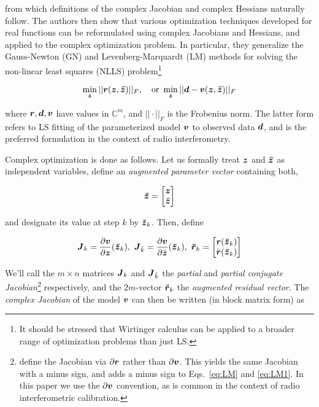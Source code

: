 \documentclass[useAMS,usenatbib]{mn2e}
\newcommand{\COMPLEX}{\mathbb{C}}
\newcommand{\zz}{\bmath{z}}
\newcommand{\zzc}{\bmath{\bar z}}
\newcommand{\rr}{\bmath{r}}
\newcommand{\vv}{\bmath{v}}
\newcommand{\mat}[1]{{\bmath{#1}}}
\newcommand{\JJ}{\mat{J}} %
\begin{document}
from which definitions of the complex Jacobian and complex Hessians naturally follow. The authors then show 
that various optimization techniques developed for real functions can be reformulated using 
complex Jacobians and Hessians, and applied to the complex optimization problem. In particular, they generalize 
the Gauss-Newton (GN) and Levenberg-Marquardt (LM) methods for solving the non-linear least squares (NLLS) 
problem\footnote{It should be stressed that Wirtinger calculus can be applied to a broader range of 
optimization problems than just LS.}

\begin{equation}
\label{eq:LSmin}
\min_{\bmath{z}} ||\bmath{r}(\zz,\zzc)||_F,~~~\mathrm{or}~\min_{\bmath{z}} ||\bmath{d}-\bmath{v}(\zz,\zzc)||_F
\end{equation}

where $\bmath{r},\bmath{d},\bmath{v}$ have values in $\COMPLEX^m$, and $||\cdot||_F$ is the Frobenius norm. The latter form 
refers to LS fitting of the parameterized model $\bmath{v}$ to observed data $\bmath{d}$, and is the preferred formulation
in the context of radio interferometry.

Complex optimization is done as follows. Let us formally treat $\zz$ and $\zzc$ as independent variables, 
define an {\em augmented parameter vector} containing both,



\[
\Zz = \Matrix{c}{\zz \\ \zzc}
\]


and designate its value at step $k$ by $\Zz_k$. Then, define


\begin{equation}
\label{eq:Jkrk}
\JJ_k=\frac{\partial \vv}{\partial \zz} (\Zz_k), ~\JJ_{\bar{k}}=\frac{\partial \vv}{\partial \bar{\zz}}(\Zz_k),~
\Rr_k=\Matrix{c}{\rr(\Zz_k)\\\bar{\rr}(\Zz_k)}
\end{equation}

We'll call the $m\times n$ matrices $\JJ_k$ and $\JJ_{\bar{k}}$ the \emph{partial} and \emph{partial conjugate 
Jacobian}\footnote{\citet{ComplexOpt} define the Jacobian via $\partial\rr$ rather than
$\partial\vv$. This yields the same Jacobian with a minus sign, and adds a minus sign to 
Eqs.~\ref{eq:LM} and \ref{eq:LM1}. In this paper we use the $\partial\vv$ convention, as is common in the
context of radio interferometric calibration.}
respectively, 
and the $2m$-vector $\Rr_k$ the \emph{augmented residual vector}. The \emph{complex Jacobian} 
of the model $\vv$ can then be written (in block matrix form) as
\end{document}
